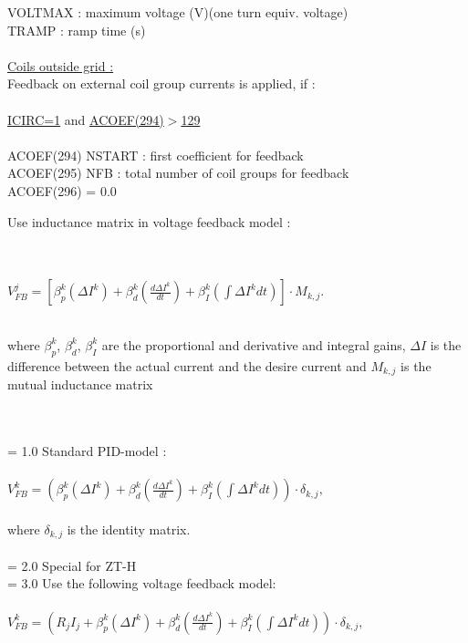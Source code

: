 \begin{tabbing}
\>  VOLTMAX :\> maximum voltage (V)(one turn equiv. voltage)\\
\>  TRAMP : \> ramp time (s)\\
 \\
\underline{Coils outside grid :}\\
Feedback on external coil group currents is applied, if :\\
 \\
\>\underline{ICIRC=1} and \underline{ACOEF(294)$>$129} \\
 \\
ACOEF(294) \> NSTART : first coefficient for feedback \\
ACOEF(295) \> NFB : total number of coil groups for feedback\\
ACOEF(296) \>= 0.0 \> \parbox[t]{\width}{Use inductance matrix in voltage feedback model :}\\
  \\
           \> $V_{FB}^j = \left[ \beta_p^k (\Delta I^k) + \beta_d^k \left( \frac{d \Delta I^k}{dt}
\right) + \beta_I^k \left( \int \Delta I^k dt \right) \right] \cdot M_{k,j}.$\\
 \\
           \>\parbox[t]{\width}{where $\beta_p^k$, $\beta_d^k$, $\beta_I^k$ are the proportional
and derivative and integral gains, $\Delta I$ is the difference between the actual current and the
desire current and $M_{k,j}$ is the mutual inductance matrix}\\
\\
           \>= 1.0 \> Standard PID-model :\\
 \\
          \> $V_{FB}^k = \left( \beta_p^k (\Delta I^k) + \beta_d^k \left( \frac{d \Delta I^k}{dt}
\right) + \beta_I^k \left( \int \Delta I^k dt \right) \right) \cdot \delta_{k,j},$\\
 \\
          \> where $\delta_{k,j}$ is the identity matrix.\\
 \\
           \>= 2.0 \> Special for ZT-H\\
           \>= 3.0 \> Use the following voltage feedback model:\\
 \\
          \> $V_{FB}^k = \left( R_j I_j + \beta_p^k (\Delta I^k) + \beta_d^k \left( \frac{d \Delta
I^k}{dt} \right) + \beta_I^k \left( \int \Delta I^k dt \right) \right) \cdot \delta_{k,j},$\\
 \\

\end{tabbing}
